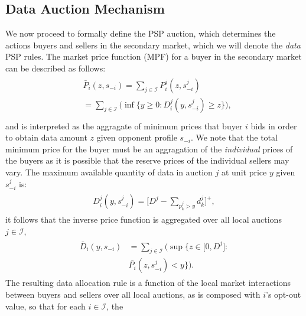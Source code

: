 \documentclass[12pt]{article}
\theoremstyle{definition}
\newcommand{\vs}{\varsigma}
\newcommand{\mcI}{\mathcal{I}}
\begin{document}
\begin{multicols}{2}
\subsection{Data Auction Mechanism}\label{mechanism}
We now proceed to formally define the PSP auction, which determines the actions 
buyers and sellers in the secondary market, which we will denote the \emph{data}
PSP rules.
The market price function (MPF) for a buyer in the secondary market
can be described as follows:
\begin{align}\label{dataprice}
\begin{split}
    &\bar{P}_i(z, s_{-i}) =\displaystyle\sum_{j\in\mcI}P_i^j(z,
s_{-i}^j)\\
    &= \sum_{j\in\mcI}\bigg(\inf\bigg\lbrace y\ge 0 : 
    {D_i^j}(y,s_{-i}^j) \ge z \bigg\rbrace \bigg),\\
\end{split}
\end{align}
and is interpreted as the aggragate of minimum prices that buyer $i$ bids in
order to obtain
data amount $z$ given opponent profile $s_{-i}$. We note that
the total minimum price for the buyer must be an aggragation of the
\emph{individual} prices of the buyers as it is possible that the reserve prices of the individual sellers may vary.
The maximum available quantity of data in auction
$j$ at unit price $y$ given $s_{-i}^j$ is: 
\begin{align}
\begin{split}\label{datacomposed}
    D_i^j(y,s_{-i}^j) = \bigg\lbrack D^j - \sum_{p_k^j> y} d_k^j\bigg\rbrack^+,
\end{split}
\end{align}
it follows that the inverse price function is aggregated over all local auctions
$j\in \mcI$,
\begin{align}\label{datapriceinverse}
\begin{split}
    \bar{D}_i(y, s_{-i}) &= \displaystyle\sum_{j\in\mcI}\bigg(\sup\bigg\lbrace z\in \big[ 0,
    D^j \big] : \\
    &\bar{P_i}(z,s_{-i}^j) < y\bigg\rbrace\bigg).
\end{split}
\end{align}
The resulting data allocation rule is a function of the local market
interactions between buyers and sellers over all local auctions, as is composed with $i$'s opt-out value, so that for each $i \in \mcI$, the

\end{multicols}
\end{document}
